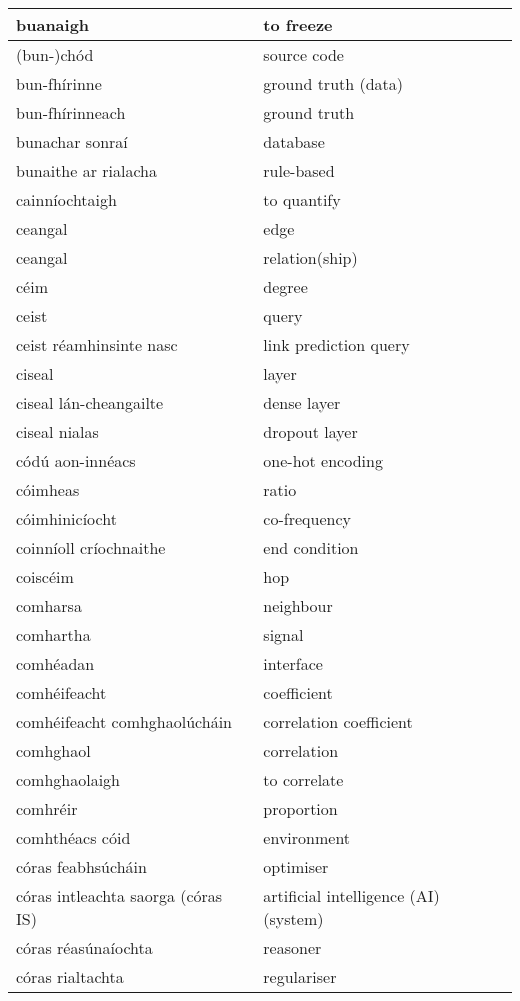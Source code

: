 \begin{longtable}{|l|l|}
		buanaigh&to freeze\\ \hline 
		(bun-)chód&source code\\ \hline 
		bun-fhírinne&ground truth (data)\\ \hline 
		bun-fhírinneach&ground truth\\ \hline 
		bunachar sonraí&database\\ \hline 
		bunaithe ar rialacha&rule-based\\ \hline 
		cainníochtaigh&to quantify\\ \hline 
		ceangal&edge\\ \hline 
		ceangal&relation(ship)\\ \hline 
		céim&degree\\ \hline 
		ceist&query\\ \hline 
		ceist réamhinsinte nasc&link prediction query\\ \hline 
		ciseal&layer\\ \hline 
		ciseal lán-cheangailte&dense layer\\ \hline 
		ciseal nialas&dropout layer\\ \hline 
		códú aon-innéacs&one-hot encoding\\ \hline 
		cóimheas&ratio\\ \hline 
		cóimhinicíocht&co-frequency\\ \hline 
		coinníoll críochnaithe&end condition\\ \hline 
		coiscéim&hop\\ \hline 
		comharsa&neighbour\\ \hline 
		comhartha&signal\\ \hline 
		comhéadan&interface\\ \hline 
		comhéifeacht&coefficient\\ \hline 
		comhéifeacht comhghaolúcháin&correlation coefficient\\ \hline 
		comhghaol&correlation\\ \hline 
		comhghaolaigh&to correlate\\ \hline 
		comhréir&proportion\\ \hline 
		comhthéacs cóid&environment\\ \hline 
		córas feabhsúcháin&optimiser\\ \hline 
		córas intleachta saorga (córas IS)&artificial intelligence (AI) (system)\\ \hline 
		córas réasúnaíochta&reasoner\\ \hline 
		córas rialtachta&regulariser\\ \hline 

\end{longtable}
